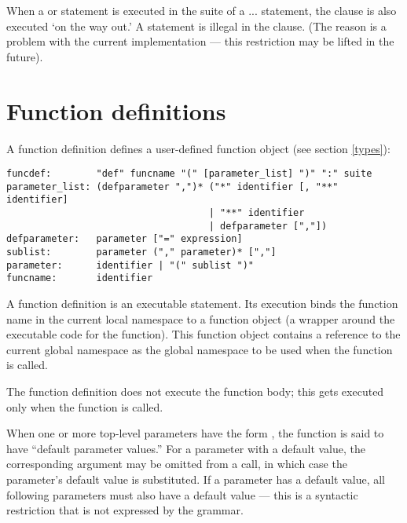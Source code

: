 When a  or  statement is executed in the
 suite of a ... statement, the
 clause is also executed `on the way out.'  A
 statement is illegal in the  clause.  (The
reason is a problem with the current implementation --- this
restriction may be lifted in the future).

\section{Function definitions\label{function}}

A function definition defines a user-defined function object (see
section \ref{types}):

\begin{verbatim}
funcdef:        "def" funcname "(" [parameter_list] ")" ":" suite
parameter_list: (defparameter ",")* ("*" identifier [, "**" identifier] 
                                    | "**" identifier 
                                    | defparameter [","])
defparameter:   parameter ["=" expression]
sublist:        parameter ("," parameter)* [","]
parameter:      identifier | "(" sublist ")"
funcname:       identifier
\end{verbatim}

A function definition is an executable statement.  Its execution binds
the function name in the current local namespace to a function object
(a wrapper around the executable code for the function).  This
function object contains a reference to the current global namespace
as the global namespace to be used when the function is called.

The function definition does not execute the function body; this gets
executed only when the function is called.

When one or more top-level parameters have the form 
\code{=} , the function is said to have ``default
parameter values.''  For a parameter with a
default value, the corresponding argument may be omitted from a call,
in which case the parameter's default value is substituted.  If a
parameter has a default value, all following parameters must also have
a default value --- this is a syntactic restriction that is not
expressed by the grammar.


